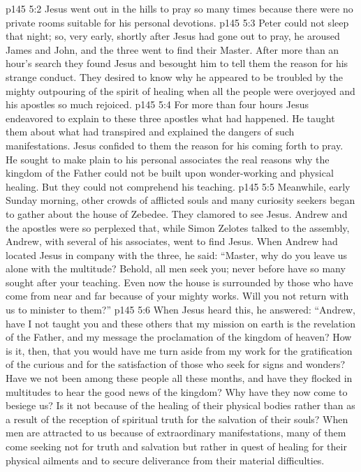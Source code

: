 \vs p145 5:2 Jesus went out in the hills to pray so many times because there were no private rooms suitable for his personal devotions.
\vs p145 5:3 Peter could not sleep that night; so, very early, shortly after Jesus had gone out to pray, he aroused James and John, and the three went to find their Master. After more than an hour’s search they found Jesus and besought him to tell them the reason for his strange conduct. They desired to know why he appeared to be troubled by the mighty outpouring of the spirit of healing when all the people were overjoyed and his apostles so much rejoiced.
\vs p145 5:4 For more than four hours Jesus endeavored to explain to these three apostles what had happened. He taught them about what had transpired and explained the dangers of such manifestations. Jesus confided to them the reason for his coming forth to pray. He sought to make plain to his personal associates the real reasons why the kingdom of the Father could not be built upon wonder\hyp{}working and physical healing. But they could not comprehend his teaching.
\vs p145 5:5 Meanwhile, early Sunday morning, other crowds of afflicted souls and many curiosity seekers began to gather about the house of Zebedee. They clamored to see Jesus. Andrew and the apostles were so perplexed that, while Simon Zelotes talked to the assembly, Andrew, with several of his associates, went to find Jesus. When Andrew had located Jesus in company with the three, he said: “Master, why do you leave us alone with the multitude? Behold, all men seek you; never before have so many sought after your teaching. Even now the house is surrounded by those who have come from near and far because of your mighty works. Will you not return with us to minister to them?”
\vs p145 5:6 When Jesus heard this, he answered: \textcolor{ubdarkred}{“Andrew, have I not taught you and these others that my mission on earth is the revelation of the Father, and my message the proclamation of the kingdom of heaven? How is it, then, that you would have me turn aside from my work for the gratification of the curious and for the satisfaction of those who seek for signs and wonders? Have we not been among these people all these months, and have they flocked in multitudes to hear the good news of the kingdom? Why have they now come to besiege us? Is it not because of the healing of their physical bodies rather than as a result of the reception of spiritual truth for the salvation of their souls? When men are attracted to us because of extraordinary manifestations, many of them come seeking not for truth and salvation but rather in quest of healing for their physical ailments and to secure deliverance from their material difficulties.}
